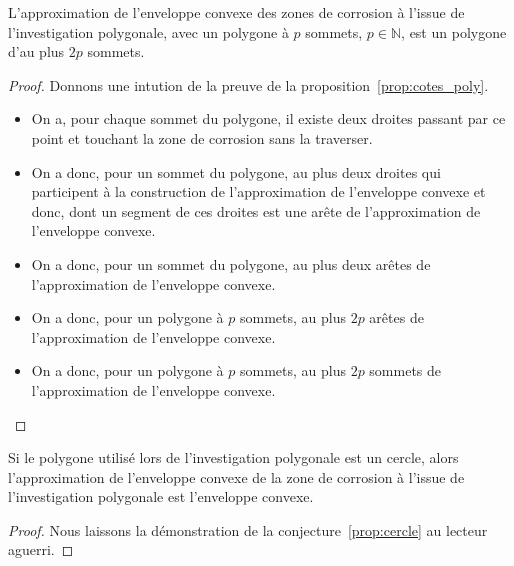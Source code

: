 \documentclass[francais,RandD]{rapportPFE}
\begin{document}
				\begin{Proposition}
					L'approximation de l'enveloppe convexe des zones de corrosion à l'issue de l'investigation polygonale, avec un polygone à $p$ sommets, $p \in \mathbb{N}$, est un polygone d'au plus $2p$ sommets.
					\label{prop:cotes_poly}
				\end{Proposition}
				\begin{proof}
					Donnons une intution de la preuve de la proposition~\ref{prop:cotes_poly}.
					\begin{itemize}
						\item On a, pour chaque sommet du polygone, il existe deux droites passant par ce point et touchant la zone de corrosion sans la traverser.
						\item On a donc, pour un sommet du polygone, au plus deux droites qui participent à la construction de l'approximation de l'enveloppe convexe et donc, dont un segment de ces droites est une arête de l'approximation de l'enveloppe convexe.
						\item On a donc, pour un sommet du polygone, au plus deux arêtes de l'approximation de l'enveloppe convexe.
						\item On a donc, pour un polygone à $p$ sommets, au plus $2p$ arêtes de l'approximation de l'enveloppe convexe.
						\item On a donc, pour un polygone à $p$ sommets, au plus $2p$ sommets de l'approximation de l'enveloppe convexe.
					\end{itemize}
				\end{proof}

				\begin{Conjecture}
					Si le polygone utilisé lors de l'investigation polygonale est un cercle, alors l'approximation de l'enveloppe convexe de la zone de corrosion à l'issue de l'investigation polygonale est l'enveloppe convexe.
					\label{prop:cercle}
				\end{Conjecture}
				\begin{proof}
					Nous laissons la démonstration de la conjecture~\ref{prop:cercle} au lecteur aguerri.
				\end{proof}
\end{document}
